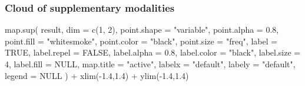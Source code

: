 \documentclass[
  letterpaper,
  DIV=11,
  numbers=noendperiod]{scrartcl}
\newenvironment{Shaded}{\begin{snugshade}}{\end{snugshade}}
\newcommand{\AttributeTok}[1]{\textcolor[rgb]{0.40,0.45,0.13}{#1}}
\newcommand{\ConstantTok}[1]{\textcolor[rgb]{0.56,0.35,0.01}{#1}}
\newcommand{\DecValTok}[1]{\textcolor[rgb]{0.68,0.00,0.00}{#1}}
\newcommand{\FloatTok}[1]{\textcolor[rgb]{0.68,0.00,0.00}{#1}}
\newcommand{\FunctionTok}[1]{\textcolor[rgb]{0.28,0.35,0.67}{#1}}
\newcommand{\NormalTok}[1]{\textcolor[rgb]{0.00,0.23,0.31}{#1}}
\newcommand{\SpecialCharTok}[1]{\textcolor[rgb]{0.37,0.37,0.37}{#1}}
\newcommand{\StringTok}[1]{\textcolor[rgb]{0.13,0.47,0.30}{#1}}
\begin{document}
\normalsize

\subsubsection{Cloud of supplementary
modalities}\label{cloud-of-supplementary-modalities}

\scriptsize

\begin{Shaded}
\begin{Highlighting}[]
\FunctionTok{map.sup}\NormalTok{(}
\NormalTok{  result,}
  \AttributeTok{dim =} \FunctionTok{c}\NormalTok{(}\DecValTok{1}\NormalTok{, }\DecValTok{2}\NormalTok{),}
  \AttributeTok{point.shape =} \StringTok{"variable"}\NormalTok{,}
  \AttributeTok{point.alpha =} \FloatTok{0.8}\NormalTok{,}
  \AttributeTok{point.fill =} \StringTok{"whitesmoke"}\NormalTok{,}
  \AttributeTok{point.color =} \StringTok{"black"}\NormalTok{,}
  \AttributeTok{point.size =} \StringTok{"freq"}\NormalTok{,}
  \AttributeTok{label =} \ConstantTok{TRUE}\NormalTok{,}
  \AttributeTok{label.repel =} \ConstantTok{FALSE}\NormalTok{,}
  \AttributeTok{label.alpha =} \FloatTok{0.8}\NormalTok{,}
  \AttributeTok{label.color =} \StringTok{"black"}\NormalTok{,}
  \AttributeTok{label.size =} \DecValTok{4}\NormalTok{,}
  \AttributeTok{label.fill =} \ConstantTok{NULL}\NormalTok{,}
  \AttributeTok{map.title =} \StringTok{"active"}\NormalTok{,}
  \AttributeTok{labelx =} \StringTok{"default"}\NormalTok{,}
  \AttributeTok{labely =} \StringTok{"default"}\NormalTok{,}
  \AttributeTok{legend =} \ConstantTok{NULL}
\NormalTok{) }\SpecialCharTok{+} \FunctionTok{xlim}\NormalTok{(}\SpecialCharTok{{-}}\FloatTok{1.4}\NormalTok{,}\FloatTok{1.4}\NormalTok{) }\SpecialCharTok{+} \FunctionTok{ylim}\NormalTok{(}\SpecialCharTok{{-}}\FloatTok{1.4}\NormalTok{,}\FloatTok{1.4}\NormalTok{)}
\end{Highlighting}
\end{Shaded}
\end{document}
